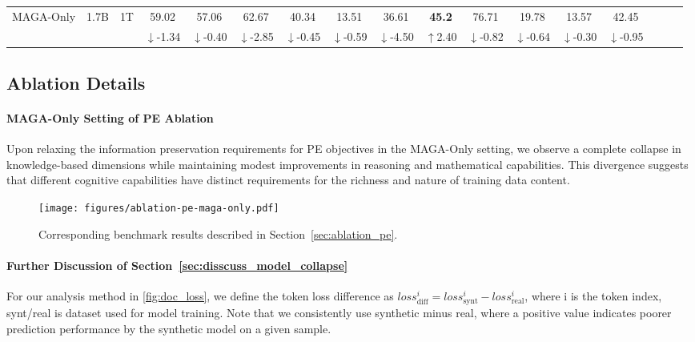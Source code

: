 \begin{table*}[h]
\begin{adjustbox}{max width=\textwidth}
{\begin{tabular}{@{\extracolsep{\fill}}lcccccccccccccccc}
    MAGA-Only & 1.7B & 1T & 59.02 & 57.06 & 62.67 & 40.34 & 13.51 & 36.61 & \textbf{45.2} & 76.71 & 19.78 & 13.57 & 42.45\\
    &  &  & \colorbox{red!15}{$\downarrow$-1.34} & \colorbox{red!15}{$\downarrow$-0.40} & \colorbox{red!15}{$\downarrow$-2.85} & \colorbox{red!15}{$\downarrow$-0.45} & \colorbox{red!15}{$\downarrow$-0.59} & \colorbox{red!15}{$\downarrow$-4.50} & \colorbox{green!15}{$\uparrow$2.40} & \colorbox{red!15}{$\downarrow$-0.82} & \colorbox{red!15}{$\downarrow$-0.64} & \colorbox{red!15}{$\downarrow$-0.30} & \colorbox{red!15}{$\downarrow$-0.95}\\
    \bottomrule
  \end{tabular}
  }
  \end{adjustbox}
  \label{tab:main_exp2}
  \vspace{-1em}
\end{table*}


\subsection{Ablation Details}
\label{sec:appd_abaltion_details}
\paragraph{MAGA-Only Setting of PE Ablation}
Upon relaxing the information preservation requirements for PE objectives in the MAGA-Only setting, 
we observe a complete collapse in knowledge-based dimensions while 
maintaining modest improvements in reasoning and mathematical capabilities. 
This divergence suggests that different cognitive capabilities have distinct requirements 
for the richness and nature of training data content.
\begin{figure*}[htb!]
    \centering
 
    \texttt{[image: figures/ablation-pe-maga-only.pdf]}
    \vspace{-2em}
    \caption{Corresponding benchmark results described in Section~\ref{sec:ablation_pe}.}
\end{figure*}

\paragraph{Further Discussion of Section~\ref{sec:disscuss_model_collapse}}
For our analysis method in \autoref{fig:doc_loss}, we define the token loss difference as $loss^i_{\text{diff}}=loss^i_{\text{synt}}-loss^i_{\text{real}}$, where i is the token index, synt/real is dataset used for model training.
Note that we consistently use synthetic minus real, where a positive value indicates poorer prediction performance by the synthetic model on a given sample.

